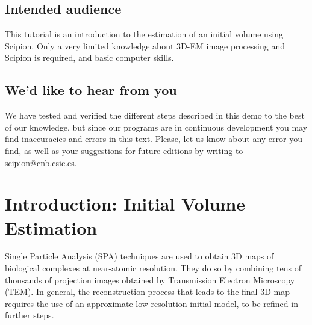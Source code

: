 \documentclass[12pt]{article} %
\begin{document}



\subsection*{Intended audience}

This tutorial is an introduction to the estimation of an initial
volume using Scipion.  Only a very limited knowledge about 3D-EM image
processing and Scipion is required, and basic computer skills.

\subsection*{We'd like to hear from you}

We have tested and verified the different steps described in this demo
to the best of our knowledge, but since our programs are in continuous
development you may find inaccuracies and errors in this text. Please,
let us know about any error you find, as well as your suggestions for
future editions by writing to
\href{mailto:scipion@cnb.csic.es}{scipion@cnb.csic.es}.

\newpage


\tableofcontents %

\newpage %


\section{Introduction: Initial Volume Estimation}

Single Particle Analysis (SPA) techniques are used to obtain 3D maps
of biological complexes at near-atomic resolution. They do so by
combining tens of thousands of projection images obtained by
Transmission Electron Microscopy (TEM). In general, the reconstruction
process that leads to the final 3D map requires the use of an
approximate low resolution initial model, to be refined in further
steps.
\end{document}
